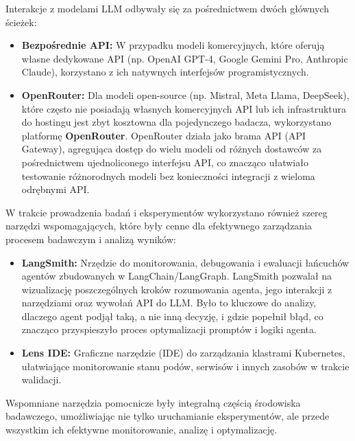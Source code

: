 Interakcje z modelami LLM odbywały się za pośrednictwem dwóch głównych ścieżek:
\begin{itemize}
	\item \textbf{Bezpośrednie API:} W przypadku modeli komercyjnych, które oferują własne dedykowane API (np. OpenAI GPT-4, Google Gemini Pro, Anthropic Claude), korzystano z ich natywnych interfejsów programistycznych.
	\item \textbf{OpenRouter:} Dla modeli open-source (np. Mistral, Meta Llama, DeepSeek), które często nie posiadają własnych komercyjnych API lub ich infrastruktura do hostingu jest zbyt kosztowna dla pojedynczego badacza, wykorzystano platformę \textbf{OpenRouter}. OpenRouter działa jako brama API (API Gateway), agregująca dostęp do wielu modeli od różnych dostawców za pośrednictwem ujednoliconego interfejsu API, co znacząco ułatwiało testowanie różnorodnych modeli bez konieczności integracji z wieloma odrębnymi API.
\end{itemize}

W trakcie prowadzenia badań i eksperymentów wykorzystano również szereg narzędzi wspomagających, które były cenne dla efektywnego zarządzania procesem badawczym i analizą wyników:
\begin{itemize}
	\item \textbf{LangSmith:} \cite{langsmith} Nrzędzie do monitorowania, debugowania i ewaluacji łańcuchów agentów zbudowanych w LangChain/LangGraph. LangSmith pozwalał na wizualizację poszczególnych kroków rozumowania agenta, jego interakcji z narzędziami oraz wywołań API do LLM. Było to kluczowe do analizy, dlaczego agent podjął taką, a nie inną decyzję, i gdzie popełnił błąd, co znacząco przyspieszyło proces optymalizacji promptów i logiki agenta.
	\item \textbf{Lens IDE:} \cite{lens_ide} Graficzne narzędzie (IDE) do zarządzania klastrami Kubernetes, ułatwiające monitorowanie stanu podów, serwisów i innych zasobów w trakcie walidacji.
\end{itemize}
Wspomniane narzędzia pomocnicze były integralną częścią środowiska badawczego, umożliwiając nie tylko uruchamianie eksperymentów, ale przede wszystkim ich efektywne monitorowanie, analizę i optymalizację.
